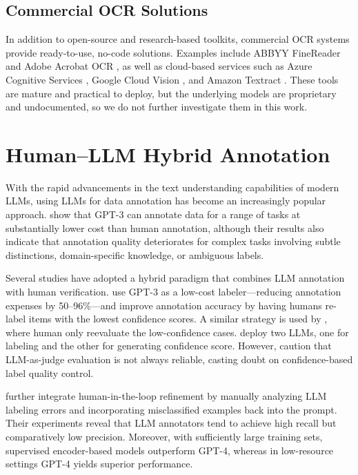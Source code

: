 \subsection{Commercial OCR Solutions}
In addition to open-source and research-based toolkits, commercial OCR systems provide ready-to-use, no-code solutions. Examples include ABBYY FineReader \parencite{abbyy} and Adobe Acrobat OCR \parencite{adobe}, as well as cloud-based services such as Azure Cognitive Services \parencite{azureocr}, Google Cloud Vision \parencite{googlevisionocr}, and Amazon Textract \parencite{textract}. These tools are mature and practical to deploy, but the underlying models are proprietary and undocumented, so we do not further investigate them in this work.


\section{Human–LLM Hybrid Annotation}

With the rapid advancements in the text understanding capabilities of modern LLMs, using LLMs for data annotation has become an increasingly popular approach. \textcite{DBLP:conf/acl/DingQLCLJB23} show that GPT-3 can annotate data for a range of tasks at substantially lower cost than human annotation, although their results also indicate that annotation quality deteriorates for complex tasks involving subtle distinctions, domain-specific knowledge, or ambiguous labels.

Several studies have adopted a hybrid paradigm that combines LLM annotation with human verification. \textcite{DBLP:conf/emnlp/WangLXZZ21} use GPT-3 as a low-cost labeler—reducing annotation expenses by 50--96\%—and improve annotation accuracy by having humans re-label items with the lowest confidence scores. A similar strategy is used by \textcite{DBLP:conf/eacl/KimMCRZ24}, where  human only reevaluate the low-confidence cases. \textcite{DBLP:conf/chi/Wang0RMM24} deploy two LLMs, one for labeling and the other for generating confidence score. However, \textcite{DBLP:journals/corr/abs-2504-11101} caution that LLM-as-judge evaluation is not always reliable, casting doubt on confidence-based label quality control.

\textcite{DBLP:conf/icwsm/PangakisW25} further integrate human-in-the-loop refinement by manually analyzing LLM labeling errors and incorporating misclassified examples back into the prompt. Their experiments reveal that LLM annotators tend to achieve high recall but comparatively low precision. Moreover, with sufficiently large training sets, supervised encoder-based models outperform GPT-4, whereas in low-resource settings GPT-4 yields superior performance.


